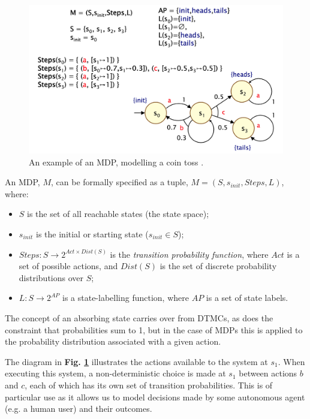 \documentclass{l4proj}
\begin{document}
\begin{figure}[h]
    \centering
    \includegraphics[scale=0.4]{images/mdpdiag1.png}   
    \caption{An example of an MDP, modelling a coin toss \cite{dpox1}.}
    \label{fig:mdpdiag} 
\end{figure}

An MDP, $M$, can be formally specified as a tuple, $M = (S, s_{init}, Steps, L)$, where:

\begin{itemize}
    \item $S$ is the set of all reachable states (the state space);
    \item $s_{init}$ is the initial or starting state ($s_{init} \in S$);
    \item $Steps : S \to 2^{Act \times Dist(S)}$ is the \textit{transition probability function}, where $Act$ is a set of possible actions, and $Dist(S)$ is the set of discrete probability distributions over $S$;
    \item $L : S \to 2^{AP}$ is a state-labelling function, where $AP$ is a set of state labels.
\end{itemize}

The concept of an absorbing state carries over from DTMCs, as does the constraint that probabilities sum to 1, but in the case of MDPs this is applied to the probability distribution associated with a given action. 

The diagram in \textbf{Fig. \ref{fig:mdpdiag}} illustrates the actions available to the system at $s_{1}$. When executing this system, a non-deterministic choice is made at $s_{1}$ between actions $b$ and $c$, each of which has its own set of transition probabilities. This is of particular use as it allows us to model decisions made by some autonomous agent (e.g. a human user) and their outcomes.
\end{document}
